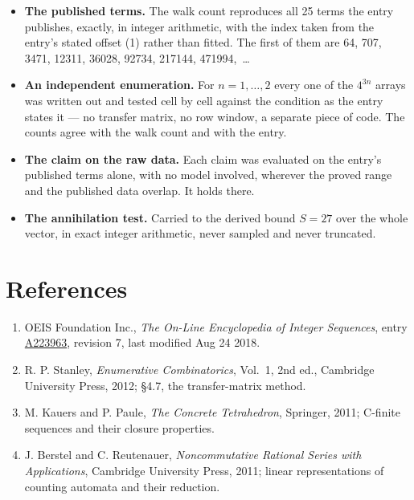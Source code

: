 \documentclass[11pt]{article}
\theoremstyle{definition}
\begin{document}
\begin{itemize}

\item {\bfseries The published terms.} The walk count reproduces all 25 terms the entry publishes, exactly, in integer arithmetic, with the index taken from the entry's stated offset (1) rather than fitted. The first of them are 64, 707, 3471, 12311, 36028, 92734, 217144, 471994,~\dots

\item {\bfseries An independent enumeration.} For $n = 1,\dots,2$ every one of the $4^{3n}$ arrays was written out and tested cell by cell against the condition as the entry states it --- no transfer matrix, no row window, a separate piece of code. The counts agree with the walk count and with the entry.

\item {\bfseries The claim on the raw data.} Each claim was evaluated on the entry's published terms alone, with no model involved, wherever the proved range and the published data overlap. It holds there.

\item {\bfseries The annihilation test.} Carried to the derived bound $S = 27$ over the whole vector, in exact integer arithmetic, never sampled and never truncated.

\end{itemize}

\section{References}

\begin{enumerate}

\item OEIS Foundation Inc., \emph{The On-Line Encyclopedia of Integer Sequences}, entry \href{https://oeis.org/A223963}{A223963}, revision 7, last modified Aug 24 2018.

\item R. P. Stanley, \emph{Enumerative Combinatorics}, Vol.~1, 2nd ed., Cambridge University Press, 2012; \S4.7, the transfer-matrix method.

\item M. Kauers and P. Paule, \emph{The Concrete Tetrahedron}, Springer, 2011; C-finite sequences and their closure properties.

\item J. Berstel and C. Reutenauer, \emph{Noncommutative Rational Series with Applications}, Cambridge University Press, 2011; linear representations of counting automata and their reduction.

\end{enumerate}
\end{document}
